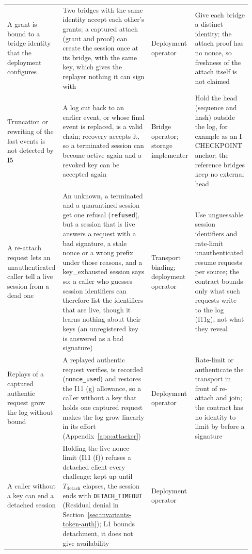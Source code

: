 \begin{longtable}{p{} p{} p{} p{}}
A grant is bound to a bridge identity that the deployment configures &
Two bridges with the same identity accept each other's grants; a captured attach (grant and proof) can create the session once at its bridge, with the same key, which gives the replayer nothing it can sign with &
Deployment operator &
Give each bridge a distinct identity; the attach proof has no nonce, so freshness of the attach itself is not claimed \\
Truncation or rewriting of the last events is not detected by I5 &
A log cut back to an earlier event, or whose final event is replaced, is a valid chain; recovery accepts it, so a terminated session can become active again and a revoked key can be accepted again &
Bridge operator; storage implementer &
Hold the head (sequence and hash) outside the log, for example as an I-CHECKPOINT anchor; the reference bridges keep no external head \\
A re-attach request lets an unauthenticated caller tell a live session from a dead one &
An unknown, a terminated and a quarantined session get one refusal (\texttt{refused}), but a session that is live answers a request with a bad signature, a stale nonce or a wrong prefix under those reasons, and a key\_exhausted session says so; a caller who guesses session identifiers can therefore list the identifiers that are live, though it learns nothing about their keys (an unregistered key is answered as a bad signature) &
Transport binding; deployment operator &
Use unguessable session identifiers and rate-limit unauthenticated resume requests per source; the contract bounds only what such requests write to the log (I11g), not what they reveal \\
Replays of a captured authentic request grow the log without bound &
A replayed authentic request verifies, is recorded (\texttt{nonce\_used}) and restores the I11 (g) allowance, so a caller without a key that holds one captured request makes the log grow linearly in its effort (Appendix~\ref{app:attacker}) &
Deployment operator &
Rate-limit or authenticate the transport in front of re-attach and join; the contract has no identity to limit by before a signature \\
A caller without a key can end a detached session &
Holding the live-nonce limit (I11 (f)) refuses a detached client every challenge; kept up until $T_{\text{detach}}$ elapses, the session ends with \texttt{DETACH\_TIMEOUT} (Residual denial in Section~\ref{sec:invariants-token-auth}); L1 bounds detachment, it does not give availability &
Deployment operator &

\end{longtable}
